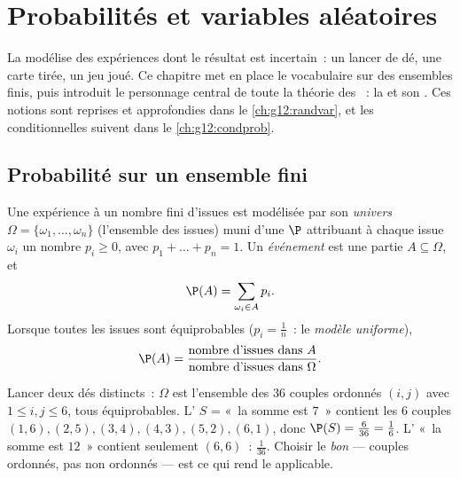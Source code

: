 \chapter{Probabilités et variables aléatoires}\label{ch:g11:prob}

La  modélise des expériences dont le résultat est incertain~:
un lancer de dé, une carte tirée, un jeu joué. Ce chapitre met en place
le vocabulaire sur des ensembles finis, puis introduit le personnage
central de toute la théorie des ~: la \emph{} et son \emph{}. Ces notions sont reprises et
approfondies dans le \cref{ch:g12:randvar}, et les 
conditionnelles suivent dans le \cref{ch:g12:condprob}.

\section{Probabilité sur un ensemble fini}

\begin{definition}\label{def:g11:prob:model}
Une expérience à un nombre fini d'issues est modélisée par son
\emph{univers} $\Omega = \{\omega_1, \dots, \omega_n\}$
(l'ensemble des issues) muni d'une \emph{} $\P$ attribuant à
chaque issue $\omega_i$ un nombre $p_i \geq 0$, avec
$p_1 + \dots + p_n = 1$. Un \emph{événement} est une
partie $A \subseteq \Omega$, et
\[
\P(A) = \sum_{\omega_i \in A} p_i .
\]
Lorsque toutes les issues sont équiprobables ($p_i = \frac1n$~: le
\emph{modèle uniforme}),
\[
\P(A) = \frac{\text{nombre d'issues dans } A}
{\text{nombre d'issues dans } \Omega}.
\]
\end{definition}

\begin{example}\label{ex:g11:prob:twodice}
Lancer deux dés distincts~: $\Omega$ est l'ensemble des $36$ couples
ordonnés $(i, j)$ avec $1 \leq i, j \leq 6$, tous équiprobables.
L' $S$ = «~la somme est $7$~» contient les $6$ couples
$(1,6), (2,5), (3,4), (4,3), (5,2), (6,1)$, donc
$\P(S) = \frac{6}{36} = \frac16$. L' «~la somme est $12$~»
contient seulement $(6,6)$~:  $\frac{1}{36}$. Choisir le
\emph{bon}  --- couples ordonnés, pas non ordonnés --- est ce qui
rend le  applicable.
\end{example}

